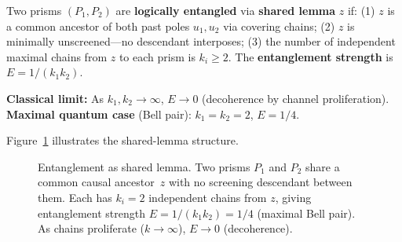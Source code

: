 \documentclass[11pt, a4paper, openany]{book}
\begin{document}
\begin{definition}\label{def:entanglement}
Two prisms $(P_1, P_2)$ are \textbf{logically entangled} via \textbf{shared lemma} $z$ if: (1) $z$ is a common ancestor of both past poles $u_1, u_2$ via covering chains; (2) $z$ is minimally unscreened---no descendant interposes; (3) the number of independent maximal chains from $z$ to each prism is $k_i \ge 2$. The \textbf{entanglement strength} is $E = 1/(k_1 k_2)$.
\end{definition}

\noindent
\textbf{Classical limit:} As $k_1, k_2 \to \infty$, $E \to 0$ (decoherence by channel proliferation). \textbf{Maximal quantum case} (Bell pair): $k_1 = k_2 = 2$, $E = 1/4$.

\noindent
Figure~\ref{fig:entanglement} illustrates the shared-lemma structure.

\begin{figure}[ht]
\centering
{}
\caption{Entanglement as shared lemma.  Two prisms $P_1$ and $P_2$
share a common causal ancestor~$z$ with no screening descendant between
them.  Each has $k_i = 2$ independent chains from $z$, giving
entanglement strength $E = 1/(k_1 k_2) = 1/4$ (maximal Bell pair).
As chains proliferate ($k \to \infty$), $E \to 0$ (decoherence).}
\label{fig:entanglement}
\end{figure}
\end{document}
